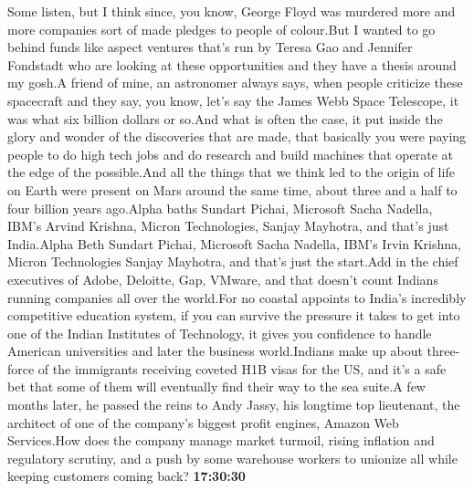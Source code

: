 \documentclass{article}%
\begin{document}
Some listen, but I think since, you know, George Floyd was murdered more and more companies sort of made pledges to people of colour.But I wanted to go behind funds like aspect ventures that's run by Teresa Gao and Jennifer Fondstadt who are looking at these opportunities and they have a thesis around my gosh.A friend of mine, an astronomer always says, when people criticize these spacecraft and they say, you know, let's say the James Webb Space Telescope, it was what six billion dollars or so.And what is often the case, it put inside the glory and wonder of the discoveries that are made, that basically you were paying people to do high tech jobs and do research and build machines that operate at the edge of the possible.And all the things that we think led to the origin of life on Earth were present on Mars around the same time, about three and a half to four billion years ago.Alpha baths Sundart Pichai, Microsoft Sacha Nadella, IBM's Arvind Krishna, Micron Technologies, Sanjay Mayhotra, and that's just  India.Alpha Beth Sundart Pichai, Microsoft Sacha Nadella, IBM's Irvin Krishna, Micron Technologies Sanjay Mayhotra, and that's just the start.Add in the chief executives of Adobe, Deloitte, Gap, VMware, and that doesn't count Indians running companies all over the world.For no coastal appoints to India's incredibly competitive education system, if you can survive the pressure it takes to get into one of the Indian Institutes of Technology, it gives you confidence to handle American universities and later the business world.Indians make up about three{-}force of the immigrants receiving coveted H1B visas for the US, and it's a safe bet that some of them will eventually find their way to the sea suite.A few months later, he passed the reins to Andy Jassy, his longtime top lieutenant, the architect of one of the company's biggest profit engines, Amazon Web Services.How does the company manage market turmoil, rising inflation and regulatory scrutiny, and a push by some warehouse workers to unionize all while keeping customers coming back?%
\textbf{17:30:30}%
\end{document}
